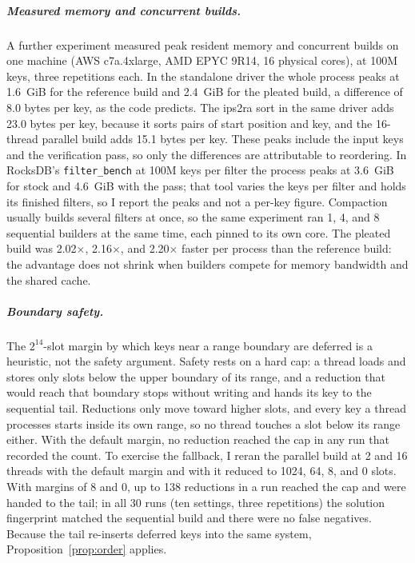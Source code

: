 \documentclass[a4paper,UKenglish,cleveref,autoref,thm-restate,anonymous]{lipics-v2021}
\begin{document}
\subparagraph*{Measured memory and concurrent builds.} A further experiment measured peak
resident memory and concurrent builds on one machine (AWS c7a.4xlarge, AMD EPYC 9R14, 16 physical
cores), at 100M keys, three repetitions each. In the standalone driver the whole process peaks at
1.6~GiB for the reference build and 2.4~GiB for the pleated build, a difference of
8.0 bytes per key, as the code predicts. The ips2ra sort in the same driver adds
23.0 bytes per key, because it sorts pairs of start position and key, and the 16-thread
parallel build adds 15.1 bytes per key. These peaks include the input keys and the verification pass, so
only the differences are attributable to reordering. In RocksDB's \texttt{filter\_bench} at 100M
keys per filter the process peaks at 3.6~GiB for stock and 4.6~GiB with the pass;
that tool varies the keys per filter and holds its finished filters, so I report the peaks and not
a per-key figure. Compaction usually builds several filters at once, so the same experiment ran 1,
4, and 8 sequential builders at the same time, each pinned to its own core. The pleated build was
2.02$\times$, 2.16$\times$, and 2.20$\times$ faster per process than the
reference build: the advantage does not shrink when builders compete for memory bandwidth and the
shared cache.

\subparagraph*{Boundary safety.} The $2^{14}$-slot margin by which keys near a range boundary are deferred
is a heuristic, not the safety argument. Safety rests on a hard cap: a thread loads and stores only
slots below the upper boundary of its range, and a reduction that would reach that boundary stops
without writing and hands its key to the sequential tail. Reductions only move toward higher slots,
and every key a thread processes starts inside its own range, so no thread touches a slot below its
range either. With the default margin, no reduction reached the cap in any run that recorded the
count. To exercise the fallback, I reran the parallel build at 2 and 16 threads with the default margin
and with it reduced to 1024, 64, 8, and 0 slots. With margins of 8 and 0, up to 138 reductions in a
run reached the cap and were handed to the tail; in all 30 runs (ten settings, three repetitions) the solution
fingerprint matched the sequential build and there were no false negatives. Because the tail re-inserts deferred keys into
the same system, Proposition~\ref{prop:order} applies.
\end{document}
